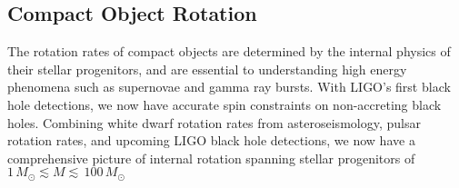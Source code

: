 {\color{orange}

\subsection{Compact Object Rotation}

The rotation rates of compact objects are determined by the internal physics of their stellar progenitors, and are essential to understanding high energy phenomena such as supernovae and gamma ray bursts. With LIGO's first black hole detections, we now have accurate spin constraints on non-accreting black holes. Combining white dwarf rotation rates from asteroseismology, pulsar rotation rates, and upcoming LIGO black hole detections, we now have a comprehensive picture of internal rotation spanning stellar progenitors of $1 \, M_\odot \lesssim M \lesssim \, 100 \, M_\odot$

}